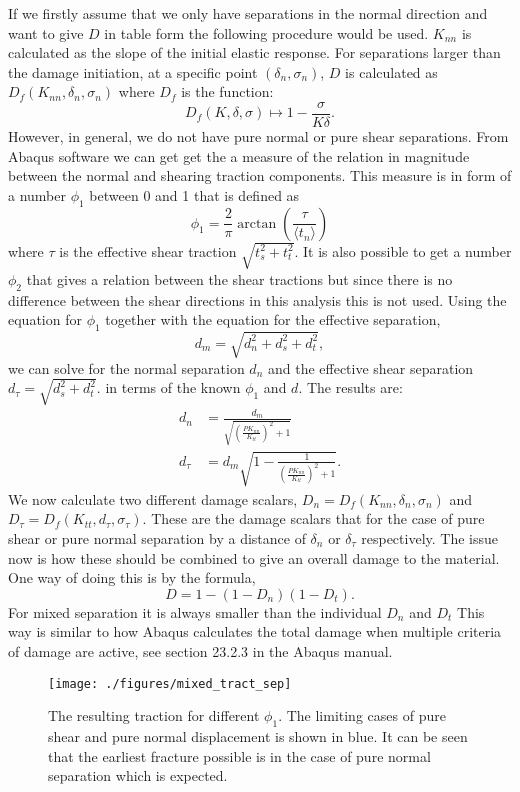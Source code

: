 \documentclass[grain_boundary_law.tex]{subfiles}
\begin{document}
If we firstly assume that we only have separations in the normal direction and want to give $D$ in table form the following procedure would be used. $K_{nn}$ is calculated as the slope of the initial elastic response. For separations larger than the damage initiation, at a specific point $(\delta_n, \sigma_n)$, $D$ is calculated as $D_f(K_{nn}, \delta_n, \sigma_n)$ where $D_f$ is the function:
%
\[ D_f(K, \delta, \sigma) \mapsto   1 - \frac{\sigma}{K\delta}. \]
%
However, in general, we do not have pure normal or pure shear separations. From Abaqus software we can get get the a measure of the relation in magnitude between the normal and shearing traction components. This measure is in form of a number $\phi_1$ between 0 and 1 that is defined as
%
\[ \phi_1 = \frac{2}{\pi} \arctan \left( \frac{ \tau}{\langle t_n \rangle} \right) \]
%
where $\tau$ is the effective shear traction $\sqrt{t_s^2 + t_t^2}$. It is also possible to get a number $\phi_2$ that gives a relation between the shear tractions but since there is no difference between the shear directions in this analysis this is not used. Using the equation for $\phi_1$ together with the equation for the effective separation,
%
\[ d_m = \sqrt{d_n^2 + d_s^2 + d_t^2},  \]
%
we can solve for the normal separation $d_n$ and the effective shear separation $ d_\tau = \sqrt{d_s^2 + d_t^2}.$ in terms of the known $\phi_1$ and $d$. The results are:
%
\begin{align}
 d_n & = \frac{d_m}{\sqrt{\left(\frac{PK_{nn}}{K_{tt}}\right)^2 + 1 }  }  \\
 d_\tau  & = d_m\sqrt{1 -\frac{1}{\left(\frac{PK_{nn}}{K_{tt}} \right)^2 + 1 }}.
\end{align}
%
We now calculate two different damage scalars, $D_n = D_f(K_{nn}, \delta_n, \sigma_n)$ and $D_\tau = D_f(K_{tt}, d_\tau, \sigma_\tau)$. These are the damage scalars that for the case of pure shear or pure normal separation by a distance of $\delta_n$ or $\delta_\tau$ respectively. The issue now is how these should be combined to give an overall damage to the material. One way of doing this is by the formula,
%
\[ D = 1 - (1 - D_n)(1 - D_t). \]
%
For mixed separation it is always smaller than the individual $D_n$ and $D_t$ This way is similar to how Abaqus calculates the total damage when multiple criteria of damage are active, see section 23.2.3 in the Abaqus manual. 
\begin{figure}[h]
\centering
  \texttt{[image: ./figures/mixed\_tract\_sep]}
\caption{The resulting traction for different $\phi_1$. The limiting cases of pure shear and pure normal displacement is shown in blue. It can be seen that the earliest fracture possible is in the case of pure normal separation which is expected. }
\label{fig:mixed_tract_sep}
\end{figure}
\end{document}
